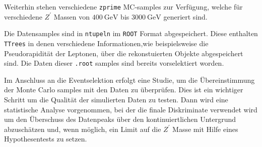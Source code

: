 Weiterhin stehen verschiedene \texttt{zprime} MC-samples zur Verfügung, welche für verschiedene $Z^\prime$ Massen von $\SI{400}{\giga\electronvolt}$ bis
$\SI{3000}{\giga\electronvolt}$ generiert sind. \par
Die Datensamples sind in \texttt{ntupeln} im \texttt{ROOT} Format abgespeichert. Diese enthalten \texttt{TTrees} in denen verschiedene Informationen,wie beispielsweise
die Pseudorapidität der Leptonen, über
die rekonstuierten Objekte abgespeichert sind. Die Daten dieser \texttt{.root} samples sind bereits vorselektiert worden. \par

Im Anschluss an die Eventselektion erfolgt eine Studie, um die Übereinstimmung der Monte Carlo samples mit den Daten zu überprüfen. Dies ist ein wichtiger
Schritt um die Qualität der simulierten Daten zu testen. Dann wird eine statistische Analyse vorgenommen, bei der die finale Diskriminate verwendet wird
um den Überschuss des Datenpeaks über den kontinuiertlichen Untergrund abzuschätzen und, wenn möglich, ein Limit auf die $Z^\prime$ Masse mit Hilfe eines
Hypothesentests zu setzen.
